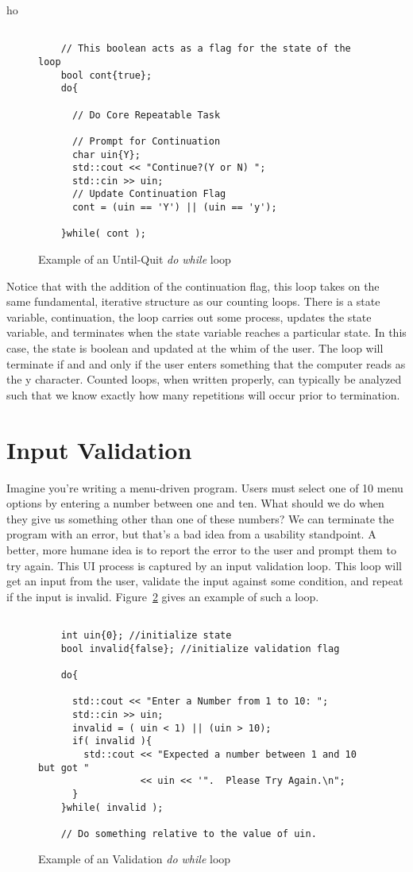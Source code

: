ho\documentclass[]{tufte-handout}
\begin{document}
\begin{figure}
  \begin{lstlisting}

    // This boolean acts as a flag for the state of the loop
    bool cont{true};
    do{

      // Do Core Repeatable Task

      // Prompt for Continuation
      char uin{Y};
      std::cout << "Continue?(Y or N) ";
      std::cin >> uin;
      // Update Continuation Flag
      cont = (uin == 'Y') || (uin == 'y');

    }while( cont );
  \end{lstlisting}
  \caption{Example of an Until-Quit \textit{do while} loop}
\label{loop:untilquit}
\end{figure}

Notice that with the addition of the continuation flag, this loop takes on the same fundamental, iterative structure as our counting loops. There is a state variable, continuation, the loop carries out some process, updates the state variable, and terminates when the state variable reaches a particular state. In this case, the state is boolean and updated at the whim of the user. The loop will terminate if and and only if the user enters something that the computer reads as the y character. Counted loops, when written properly, can typically be analyzed such that we know exactly how many repetitions will occur prior to termination.

\section{Input Validation}

Imagine you're writing a menu-driven program. Users must select one of 10 menu options by entering a number between one and ten. What should we do when they give us something other than one of these numbers?  We can terminate the program with an error, but that's a bad idea from a usability standpoint.  A better, more humane idea is to report the error to the user and prompt them to try again. This UI process is captured by an input validation loop. This loop will get an input from the user, validate the input against some condition, and repeat if the input is invalid.  Figure~\ref{loop:validation} gives an example of such a loop.

\begin{figure}
  \begin{lstlisting}

    int uin{0}; //initialize state
    bool invalid{false}; //initialize validation flag

    do{

      std::cout << "Enter a Number from 1 to 10: ";
      std::cin >> uin;
      invalid = ( uin < 1) || (uin > 10);
      if( invalid ){
        std::cout << "Expected a number between 1 and 10 but got "
                  << uin << '".  Please Try Again.\n";
      }
    }while( invalid );

    // Do something relative to the value of uin.
  \end{lstlisting}
  \caption{Example of an Validation \textit{do while} loop}
\label{loop:validation}
\end{figure}
\end{document}
